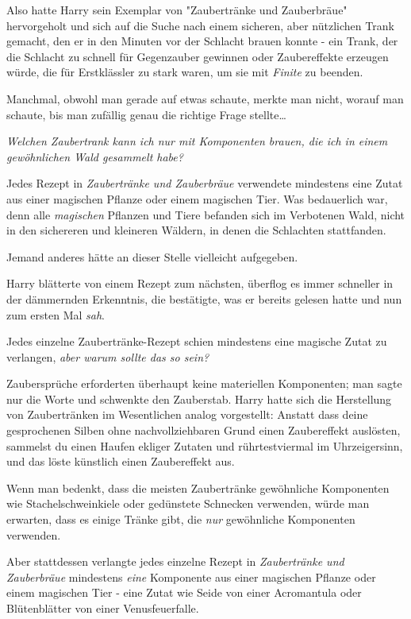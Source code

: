 {Also hatte Harry sein Exemplar von "Zaubertränke und Zauberbräue" hervorgeholt und sich auf die Suche nach einem sicheren, aber nützlichen Trank gemacht, den er in den Minuten vor der Schlacht brauen konnte - ein Trank, der die Schlacht zu schnell für Gegenzauber gewinnen oder Zaubereffekte erzeugen würde, die für Erstklässler zu stark waren, um sie mit \emph{Finite} zu beenden.

Manchmal, obwohl man gerade auf etwas schaute, merkte man nicht, worauf man schaute, bis man zufällig genau die richtige Frage stellte…

\emph{Welchen Zaubertrank kann ich nur mit Komponenten brauen, die ich in einem gewöhnlichen Wald gesammelt habe?}

Jedes Rezept in \emph{Zaubertränke und Zauberbräue} verwendete mindestens eine Zutat aus einer magischen Pflanze oder einem magischen Tier. Was bedauerlich war, denn alle \emph{magischen} Pflanzen und Tiere befanden sich im Verbotenen Wald, nicht in den sichereren und kleineren Wäldern, in denen die Schlachten stattfanden.

Jemand anderes hätte an dieser Stelle vielleicht aufgegeben.

Harry blätterte von einem Rezept zum nächsten, überflog es immer schneller in der dämmernden Erkenntnis, die bestätigte, was er bereits gelesen hatte und nun zum ersten Mal \emph{sah}.

Jedes einzelne Zaubertränke-Rezept schien mindestens eine magische Zutat zu verlangen, \emph{aber warum sollte das so sein?}

Zaubersprüche erforderten überhaupt keine materiellen Komponenten; man sagte nur die Worte und schwenkte den Zauberstab. Harry hatte sich die Herstellung von Zaubertränken im Wesentlichen analog vorgestellt: Anstatt dass deine gesprochenen Silben ohne nachvollziehbaren Grund einen Zaubereffekt auslösten, sammelst du einen Haufen ekliger Zutaten und rührtestviermal im Uhrzeigersinn, und das löste künstlich einen Zaubereffekt aus.

Wenn man bedenkt, dass die meisten Zaubertränke gewöhnliche Komponenten wie Stachelschweinkiele oder gedünstete Schnecken verwenden, würde man erwarten, dass es einige Tränke gibt, die \emph{nur} gewöhnliche Komponenten verwenden.

Aber stattdessen verlangte jedes einzelne Rezept in \emph{Zaubertränke und Zauberbräue} mindestens \emph{eine} Komponente aus einer magischen Pflanze oder einem magischen Tier - eine Zutat wie Seide von einer Acromantula oder Blütenblätter von einer Venusfeuerfalle.

}
